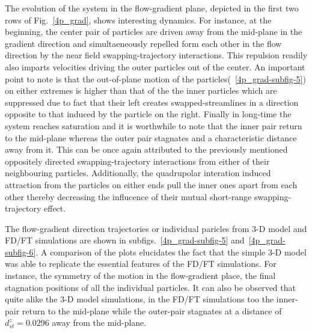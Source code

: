 The evolution of the system in the flow-gradient plane, depicted in the first two rows of Fig.~\ref{4p_grad}, shows interesting dynamics. For instance, at the beginning, the center pair of particles are driven away from the mid-plane in the gradient direction and simultaeneously repelled form each other in the flow direction by the near field swapping-trajectory interactions. This repulsion readily also imparts velocities driving the outer particles out of the center. An important point to note is that the out-of-plane motion of the particles(~\ref{4p_grad-subfig-5}) on either extremes is higher than that of the the inner particles which are suppressed  due to fact that their left creates swapped-streamlines in a direction opposite to that induced by the particle on the right. Finally in long-time the system reaches saturation and it is worthwhile to note that the inner pair return to the mid-plane whereas the outer pair stagnates and a characteristic distance away from it. This can be once again attributed to the previously mentioned oppositely directed swapping-trajectory interactions from either of their neighbouring particles. Additionally, the quadrupolar interation induced attraction from the particles on either ends pull the inner ones apart from each other thereby decreasing the influcence of their mutual short-range swapping-trajectory effect. 

The flow-gradient direction trajectories or individual paricles from 3-D model and FD/FT simulations are shown in subfigs.~\ref{4p_grad-subfig-5} and~\ref{4p_grad-subfig-6}. A comparison of the plots elucidates the fact that the simple 3-D model was able to replicate the essential features of the FD/FT simulations. For instance, the symmetry of the motion in the flow-gradient place, the final stagnation positions of all the individual particles. It can also be observed that quite alike the 3-D model simulations, in the FD/FT simulations too the inner-pair return to the mid-plane while the outer-pair stagnates at a distance of $d_{st}^z = 0.0296$ away from the mid-plane.

